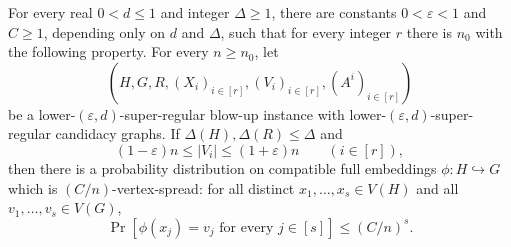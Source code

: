 \begin{theorem}
For every real $0<d\leq1$ and integer $\Delta\geq1$, there are constants $0<\varepsilon<1$ and $C\geq1$, depending only on $d$ and $\Delta$, such that for every integer $r$ there is $n_0$ with the following property.  For every $n\geq n_0$, let
\[
 (H,G,R,(X_i)_{i\in[r]},(V_i)_{i\in[r]},(A^i)_{i\in[r]})
\]
be a lower-$(\varepsilon,d)$-super-regular blow-up instance with lower-$(\varepsilon,d)$-super-regular candidacy graphs.  If $\Delta(H),\Delta(R)\leq\Delta$ and
\[
 (1-\varepsilon)n\leq |V_i|\leq(1+\varepsilon)n
 \qquad(i\in[r]),
\]
then there is a probability distribution on compatible full embeddings $\phi:H\hookrightarrow G$ which is $(C/n)$-vertex-spread: for all distinct $x_1,\ldots,x_s\in V(H)$ and all $v_1,\ldots,v_s\in V(G)$,
\[
 \Pr[\phi(x_j)=v_j\text{ for every }j\in[s]]\leq(C/n)^s.
\]
\end{theorem}
